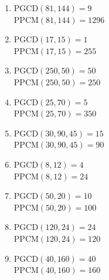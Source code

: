 %
%
  \begin{enumerate}[cols=2]
    \item $\mathrm{PGCD}(81,144)=9$\\$\mathrm{PPCM}(81,144)=\num{1296}$
    \item $\mathrm{PGCD}(17,15)=1$\\$\mathrm{PPCM}(17,15)=\num{255}$
    \item $\mathrm{PGCD}(250,50)=50$\\$\mathrm{PPCM}(250,50)=\num{250}$
    \item $\mathrm{PGCD}(25,70)=5$\\$\mathrm{PPCM}(25,70)=\num{350}$
    \item $\mathrm{PGCD}(30,90,45)=15$\\$\mathrm{PPCM}(30,90,45)=\num{90}$
    \item $\mathrm{PGCD}(8,12)=4$\\$\mathrm{PPCM}(8,12)=\num{24}$
    \item $\mathrm{PGCD}(50,20)=10$\\$\mathrm{PPCM}(50,20)=\num{100}$
    \item $\mathrm{PGCD}(120,24)=24$\\$\mathrm{PPCM}(120,24)=\num{120}$
    \item $\mathrm{PGCD}(40,160)=40$\\$\mathrm{PPCM}(40,160)=\num{160}$
  \end{enumerate}
